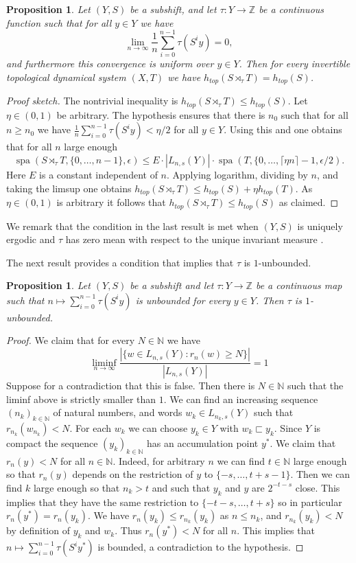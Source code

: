 \documentclass[a4paper,oneside]{amsart}
\renewcommand{\(}{\begin{dmath*}}
\renewcommand{\)}{\end{dmath*}}
\newtheorem{proposition}[theorem]{Proposition}
\theoremstyle{definition}
\newcommand{\N}{\mathbb{N}}
\newcommand{\Z}{\mathbb{Z}}
\newcommand{\spa}{\operatorname{spa}}
\begin{document}
  
\label{sec:examples}
\begin{proposition}\label{criterion-zero-entropy}
    Let $(Y,S)$ be a subshift,  and let $\tau\colon Y\to\Z$ be a continuous function such that for all $y\in Y$ we have  
    \[\lim_{n\to\infty}\frac{1}{n}\sum_{i=0}^{n-1}\tau(S^iy)= 0,\]
    and furthermore this convergence is uniform over $y\in Y$. Then for every invertible topological dynamical system $(X,T)$ we have $h_{top}(S\rtimes_\tau T)=h_{top}(S)$.
\end{proposition}
\begin{proof}[Proof sketch]
The nontrivial inequality is $h_{top}(S\rtimes_\tau T)\leq h_{top}(S)$. Let $\eta\in(0,1)$ be arbitrary. The hypothesis ensures that there is $n_0$ such that for all $n\geq n_0$ we have $\frac{1}{n}\sum_{i=0}^{n-1}\tau(S^iy)<\eta/2$ for all $y\in Y$. Using this and  one obtains that for all $n$ large enough
\[\spa(S\rtimes_\tau T,\{0,\dots,n-1\},\epsilon)\leq E\cdot |L_{n,s}(Y)|\cdot \spa(T,\{0,\dots,\lceil \eta n\rceil-1,\epsilon/2).\]
Here $E$ is a constant independent of $n$. Applying logarithm, dividing by $n$, and taking the limsup one obtains $h_{top}(S\rtimes_\tau T)\leq h_{top}(S)+\eta h_{top}(T)$. As $\eta\in(0,1)$ is arbitrary it follows that   $h_{top}(S\rtimes_\tau T)\leq h_{top}(S)$ as claimed.
\end{proof}
We remark that the condition in the last result is met when $(Y,S)$ is uniquely ergodic and $\tau$ has zero mean with respect to the unique invariant measure \cite[Theorem 4.10]{einsiedler_ergodic_2011}.

The next result provides a condition that implies that $\tau$ is $1$-unbounded.  
\begin{proposition}\label{criterion-1-unbounded}
    Let $(Y,S)$ be a subshift and let $\tau\colon Y\to \Z$ be a continuous map such that $n\mapsto\sum_{i=0}^{n-1}\tau(S^iy)$ is unbounded for every $y\in Y$. Then $\tau$ is $1$-unbounded.
\end{proposition}
\begin{proof}
    We claim that for every $N\in\N$ we have \[\liminf_{n\to\infty} \frac{|\{w\in L_{n,s}(Y) : r_n(w)\geq N\}|}{|L_{n,s}(Y)|}=1\]
    Suppose for a contradiction that this is false. Then there is $N\in\N$ such that the liminf above is strictly smaller than $1$. We can find an increasing sequence $(n_k)_{k\in\N}$ of natural numbers, and words $w_k\in L_{n_k,s}(Y)$ such that $r_{n_k}(w_{n_k})< N$. For each $w_k$ we can choose $y_k\in Y$ with $w_k\sqsubset y_k$. Since $Y$ is compact the sequence $(y_k)_{k\in\N}$ has an accumulation point $y^*$. We claim that $r_n(y)<N$ for all $n\in\N$. Indeed, for arbitrary $n$ we can find $t\in\N$ large enough so that $r_n(y)$ depends on the restriction of $y$ to $\{-s,\dots,t+s-1\}$. Then we can find $k$ large enough so that $n_k>t$ and such that $y_k$ and $y$ are $2^{-t-s}$ close. This implies that they have the same restriction to $\{-t-s,\dots,t+s\}$ so in particular $r_n(y^{\ast})=r_n(y_k)$. We have $r_n(y_k)\leq r_{n_k}(y_k)$ as $n\leq n_k$, and $r_{n_k}(y_k)< N$ by definition of $y_k$ and $w_k$. Thus $r_n(y^{\ast})<N$ for all $n$. This implies that $n\mapsto\sum_{i=0}^{n-1}\tau(S^iy^\ast)$ is bounded, a contradiction to the hypothesis. 
\end{proof}
\end{document}
